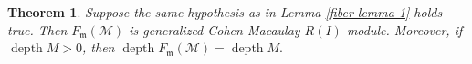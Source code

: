 \documentclass[11pt,reqno]{amsart}
\newtheorem{theorem}{Theorem}[section]
\newtheorem{lemma}[theorem]{Lemma}
\theoremstyle{definition}
\newcommand{\m}{\mathfrak m}
\def\U{{\mathcal U}}
\def\M{{\mathcal M}}
\DeclareMathOperator{\h}{H}
\DeclareMathOperator{\depth}{depth}
\numberwithin{equation}{section}
\begin{document}
    
    
    
    

\begin{theorem}\label{theorem-fiber-1}
	Suppose the same hypothesis as in Lemma \ref{fiber-lemma-1} holds true. Then 
	$F_\m(\M)$ is generalized Cohen-Macaulay $R(I)$-module. Moreover,  if $\depth M>0$, then  $\depth F_\m(\M)=\depth M.$
	\end{theorem}
\end{document}
